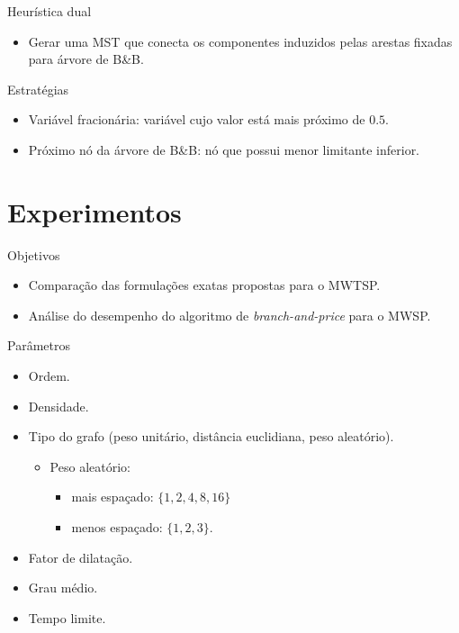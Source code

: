 \documentclass[dvipsnames]{beamer}
\begin{document}
\begin{frame}{Heurística dual \hyperlink{heurmst}{\beamergotobutton{$\rightarrow$}}}
  \hypertarget{heurdual}{}
  \begin{itemize}
  \item Gerar uma MST que conecta os componentes induzidos pelas arestas
    fixadas para árvore de B\&B.
    \end{itemize}
  \end{frame}

  \begin{frame}{Estratégias}
    \begin{itemize}
    \item Variável fracionária: variável cujo valor está mais próximo de $\num{0,5}$.
    \item Próximo nó da árvore de B\&B: nó que possui menor limitante inferior.
    \end{itemize}
  \end{frame}
  
\section{Experimentos}

\begin{frame}{Objetivos}
  \begin{itemize}
  \item Comparação das formulações exatas propostas para o MWTSP.
  \item Análise do desempenho do algoritmo de \emph{branch-and-price} para o
    MWSP.
    \end{itemize}
\end{frame}

\begin{frame}{Parâmetros}
  \begin{itemize}
  \item Ordem.
  \item Densidade.
  \item Tipo do grafo (peso unitário, distância euclidiana, peso aleatório).
    \begin{itemize}
    \item Peso aleatório:
      \begin{itemize}
      \item mais espaçado: $\{1, 2, 4, 8, 16\}$
      \item menos espaçado: $\{1, 2, 3\}$.
      \end{itemize}
    \end{itemize}
  \item Fator de dilatação.
  \item Grau médio.
    \item Tempo limite.
  \end{itemize}
\end{frame}
\end{document}
